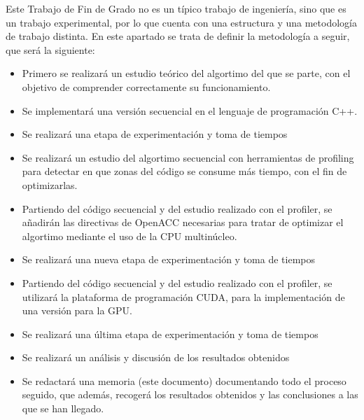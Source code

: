 Este Trabajo de Fin de Grado no es un típico trabajo de ingeniería, sino que es un trabajo experimental, por lo que cuenta con una estructura y una metodología de trabajo distinta. En este apartado se trata de definir la metodología a seguir, que será la siguiente: \\

\begin{itemize}
    \item Primero se realizará un estudio teórico del algortimo del que se parte, con el objetivo de comprender correctamente su funcionamiento.
    \item Se implementará una versión secuencial en el lenguaje de programación C++.
    \item Se realizará una etapa de experimentación y toma de tiempos 
    \item Se realizará un estudio del algortimo secuencial con herramientas de profiling para detectar en que zonas del código se consume más tiempo, con el fin de optimizarlas.
    \item Partiendo del código secuencial y del estudio realizado con el profiler, se añadirán las directivas de OpenACC necesarias para tratar de optimizar el algortimo mediante el uso de la CPU multinúcleo.
    \item Se realizará una nueva etapa de experimentación y toma de tiempos
    \item Partiendo del código secuencial y del estudio realizado con el profiler, se utilizará la plataforma de programación CUDA, para la implementación de una versión para la GPU.
    \item Se realizará una última etapa de experimentación y toma de tiempos 
    \item Se realizará un análisis y discusión de los resultados obtenidos
    \item Se redactará una memoria (este documento) documentando todo el proceso seguido, que además, recogerá los resultados obtenidos y las conclusiones a las que se han llegado.
\end{itemize}
 
